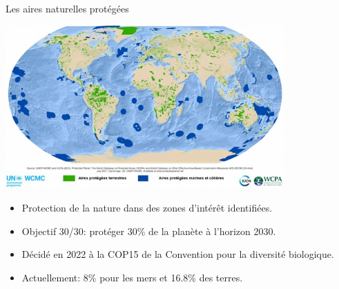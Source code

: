 \documentclass[10pt,table,dvipsnames,compress]{beamer}
\begin{document}
\begin{frame}[label={sec:org550e67e}]{Les aires naturelles protégées}
\begin{center}
\includegraphics[width=0.8\textwidth]{figs/carte-aires-protegees.jpg}
\end{center}

\begin{itemize}
\item Protection de la nature dans des zones d'intérêt identifiées.
\item Objectif 30/30: protéger 30\% de la planète à l'horizon 2030.
\item Décidé en 2022 à la COP15 de la Convention pour la diversité biologique.
\item Actuellement: 8\% pour les mers et 16.8\% des terres.
\end{itemize}
\end{frame}
\end{document}
